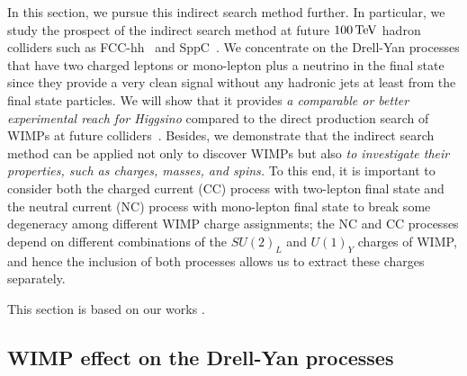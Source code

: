 \documentclass[12pt,twoside,book]{article}
\begin{document}
In this section, we pursue this indirect search method further.
In particular, we study the prospect of the indirect search method at future $100\,{\rm TeV}$ hadron colliders such as FCC-hh~\cite{Mangano:2016jyj, Contino:2016spe, Golling:2016gvc, Benedikt:2651300} and SppC~\cite{CEPC-SPPCStudyGroup:2015csa, CEPC-SPPCStudyGroup:2015esa}.
We concentrate on the Drell-Yan processes that have two charged leptons or mono-lepton plus a neutrino in the final state since they provide a very clean signal without any hadronic jets at least from the final state particles.
We will show that it provides \textit{a comparable or better experimental reach for Higgsino} compared to the direct production search of WIMPs at future colliders~\cite{Low:2014cba, Cirelli:2014dsa, Han:2018wus, Mahbubani:2017gjh}.
Besides, we demonstrate that the indirect search method can be applied not only to discover WIMPs but also \textit{to investigate their properties, such as charges, masses, and spins.}
To this end, it is important to consider both the charged current (CC) process with two-lepton final state and the neutral current (NC) process with mono-lepton final state to break some degeneracy among different WIMP charge assignments; the NC and CC processes depend on different combinations of the $SU(2)_L$ and $U(1)_Y$ charges of WIMP, and hence the inclusion of both processes allows us to extract these charges separately.

This section is based on our works \cite{Chigusa:2018vxz, Abe:2019egv}.


\subsection{WIMP effect on the Drell-Yan processes}
\label{sec:WIMP}
\end{document}
